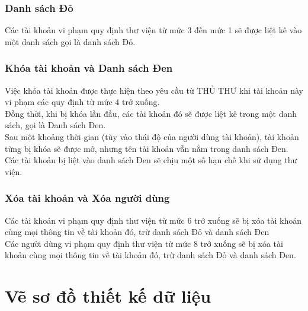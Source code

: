 \documentclass[12pt,a4paper]{report}
\begin{document}
			\subsubsection{Danh sách Đỏ}
			Các tài khoản vi phạm quy định thư viện từ mức 3 đến mức 1 sẽ được liệt kê vào một danh sách gọi là danh sách Đỏ.\\

			\subsubsection{Khóa tài khoản và Danh sách Đen}
			Việc khóa tài khoản được thực hiện theo yêu cầu từ THỦ THƯ khi tài khoản này vi phạm các quy định từ mức 4 trở xuống.\\
			Đồng thời, khi bị khóa lần đầu, các tài khoản đó sẽ được liệt kê trong một danh sách, gọi là Danh sách Đen.\\
			Sau một khoảng thời gian (tùy vào thái độ của người dùng tài khoản), tài khoản từng bị khóa sẽ được mở, nhưng tên tài khoản vẫn nằm trong danh sách Đen.\\
			Các tài khoản bị liệt vào danh sách Đen sẽ chịu một số hạn chế khi sử dụng thư viện.\\

			\subsubsection{Xóa tài khoản và Xóa người dùng}
			Các tài khoản vi phạm quy định thư viện từ mức 6 trở xuống sẽ bị xóa tài khoản cùng mọi thông tin về tài khoản đó, trừ danh sách Đỏ và danh sách Đen\\
			Các người dùng vi phạm quy định thư viện từ mức 8 trở xuống sẽ bị xóa tài khoản cùng mọi thông tin về tài khoản đó, trừ danh sách Đỏ và danh sách Đen.\\
	\section{Vẽ sơ đồ thiết kế dữ liệu}
\end{document}
